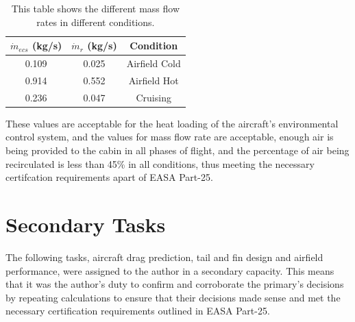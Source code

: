 \documentclass[stu, a4paper, 12pt, floatsintext]{apa7}
\numberwithin{figure}{section}
\numberwithin{table}{section}
\numberwithin{equation}{section}
\begin{document}
\begin{table}[H]
    \centering
    \caption{This table shows the different mass flow rates in different conditions. }
    \label{tab:ecs_final_mass}
    \begin{tabular}{@{}ccc@{}}
    \toprule
    \textbf{$\dot m_{ecs}$ (kg/s)} & \textbf{$\dot m_r$ (kg/s)} & \textbf{Condition} \\ \midrule
    0.109                          & 0.025                      & Airfield Cold      \\
    0.914                          & 0.552                      & Airfield Hot       \\
    0.236                          & 0.047                      & Cruising           \\ \bottomrule
    \end{tabular}
\end{table}

These values are acceptable for the heat loading of the aircraft’s environmental control system, and the values for mass flow rate are acceptable, enough air is being provided to the cabin in all phases of flight, and the percentage of air being recirculated is less than 45\% in all conditions, thus meeting the necessary certifcation requirements apart of EASA Part-25. 

\section{Secondary Tasks}
The following tasks, aircraft drag prediction, tail and fin design and airfield performance, were assigned to the author in a secondary capacity. This means that it was the author’s duty to confirm and corroborate the primary’s decisions by repeating calculations to ensure that their decisions made sense and met the necessary certification requirements outlined in EASA Part-25.  
\end{document}
